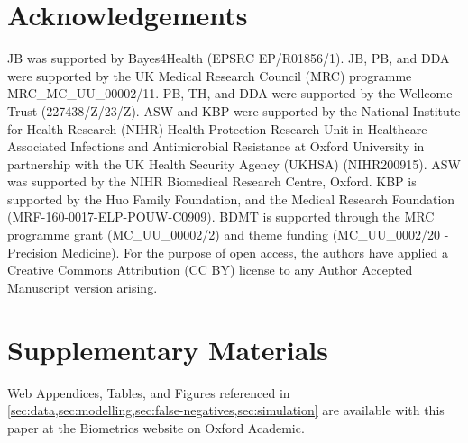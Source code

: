 \documentclass[referee,useAMS,usenatbib]{biom}
\begin{document}
\section*{Acknowledgements}
JB was supported by Bayes4Health (EPSRC  EP/R01856/1).
JB, PB, and DDA were supported by the UK Medical Research Council (MRC) programme MRC\_MC\_UU\_00002/11. 
PB, TH, and DDA were supported by the Wellcome Trust (227438/Z/23/Z).
ASW and KBP were supported by the National Institute for Health Research (NIHR) Health Protection Research Unit in Healthcare Associated Infections and Antimicrobial Resistance at Oxford University in partnership with the UK Health Security Agency (UKHSA) (NIHR200915).
ASW was supported by the NIHR Biomedical Research Centre, Oxford.
KBP is supported by the Huo Family Foundation, and the Medical Research Foundation (MRF-160-0017-ELP-POUW-C0909).
BDMT is supported through the MRC programme grant (MC\_UU\_00002/2) and theme funding (MC\_UU\_0002/20 - Precision Medicine).
For the purpose of open access, the authors have applied a Creative Commons Attribution (CC BY) license to any Author Accepted Manuscript version arising.

 

\section*{Supplementary Materials}

Web Appendices, Tables, and Figures referenced in \cref{sec:data,sec:modelling,sec:false-negatives,sec:simulation} are available with this paper at the Biometrics website on Oxford Academic.

\label{lastpage}
\end{document}
